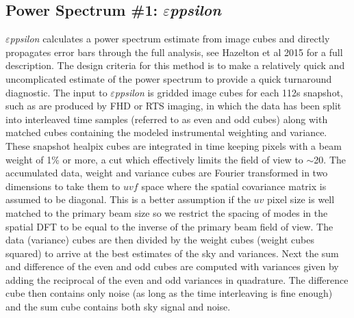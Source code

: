 \documentclass[preprint2]{aastex}
\def\eppsilon{{\it $\varepsilon$ppsilon}}
\def\eppsiloncite{Hazelton et al 2015}
\begin{document}
\subsection{Power Spectrum \#1: \eppsilon}
\label{sec:EPPSILON}
\eppsilon{} calculates a power spectrum estimate from image cubes and
directly propagates error bars through the full analysis, see \eppsiloncite{} for a full description. The design criteria for this method is to make a relatively quick and uncomplicated estimate of the power spectrum to provide a quick turnaround diagnostic. The input to \eppsilon{} is gridded image cubes for  each 112s snapshot, such as are produced by FHD or RTS imaging, in which the data has been split into interleaved time samples (referred to as even and odd cubes) along with matched cubes containing the modeled instrumental weighting and variance. These snapshot healpix cubes are integrated in time keeping pixels with a beam weight of 1\% or more, a cut which effectively limits the field of view to $\sim$20\arcdeg. The accumulated data, weight and variance cubes are Fourier transformed in two dimensions to take them to $uvf$ space where the spatial covariance matrix is assumed to be diagonal. This is a better assumption if the $uv$ pixel size is well matched to the primary beam size so we restrict the spacing of modes in the spatial DFT to be equal to the inverse of the primary beam field of view. The data (variance) cubes are then divided by the weight cubes (weight cubes squared) to arrive at the best estimates of the sky and variances. Next the sum and difference of the even and odd cubes are computed with variances given by adding the reciprocal of the even and odd variances in quadrature. The difference cube then contains only noise (as long as the time interleaving is fine enough) and the sum cube contains both sky signal and noise.
\end{document}
